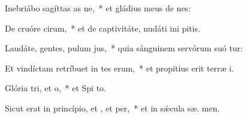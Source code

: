 \item Inebriábo sagíttas as ne,~* et gládius meus de nes:
\item De cruóre cirum,~* et de captivitáte, nudáti ini pitis.
\item Laudáte, gentes, pulum jus,~* quia sánguinem servórum suó tur:
\item Et vindíctam retríbuet in tes erum,~* et propítius erit terræ  i.
\item \singlecolsep
\item Glória tri, et o,~* et Spi to.
\item Sicut erat in princípio, et , et per,~* et in sǽcula sæ. men.

